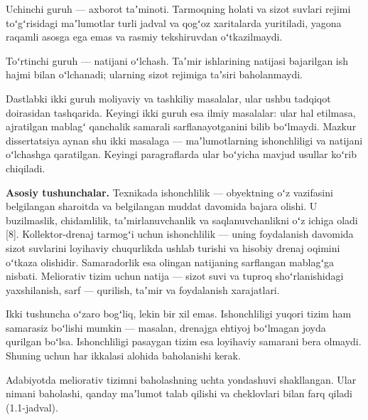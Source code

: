 Uchinchi guruh --- axborot taʼminoti. Tarmoqning holati va sizot suvlari
rejimi toʻgʻrisidagi maʼlumotlar turli jadval va qogʻoz xaritalarda
yuritiladi, yagona raqamli asosga ega emas va rasmiy tekshiruvdan
oʻtkazilmaydi.

Toʻrtinchi guruh --- natijani oʻlchash. Taʼmir ishlarining natijasi
bajarilgan ish hajmi bilan oʻlchanadi; ularning sizot rejimiga taʼsiri
baholanmaydi.

Dastlabki ikki guruh moliyaviy va tashkiliy masalalar, ular ushbu
tadqiqot doirasidan tashqarida. Keyingi ikki guruh esa ilmiy masalalar:
ular hal etilmasa, ajratilgan mablagʻ qanchalik samarali
sarflanayotganini bilib boʻlmaydi. Mazkur dissertatsiya aynan shu ikki
masalaga --- maʼlumotlarning ishonchliligi va natijani oʻlchashga
qaratilgan. Keyingi paragraflarda ular boʻyicha mavjud usullar koʻrib
chiqiladi.


\textbf{Asosiy tushunchalar.} Texnikada ishonchlilik --- obyektning oʻz
vazifasini belgilangan sharoitda va belgilangan muddat davomida bajara
olishi. U buzilmaslik, chidamlilik, taʼmirlanuvchanlik va
saqlanuvchanlikni oʻz ichiga oladi {[}8{]}. Kollektor-drenaj tarmogʻi
uchun ishonchlilik --- uning foydalanish davomida sizot suvlarini
loyihaviy chuqurlikda ushlab turishi va hisobiy drenaj oqimini oʻtkaza
olishidir. Samaradorlik esa olingan natijaning sarflangan mablagʻga
nisbati. Meliorativ tizim uchun natija --- sizot suvi va tuproq
shoʻrlanishidagi yaxshilanish, sarf --- qurilish, taʼmir va foydalanish
xarajatlari.

Ikki tushuncha oʻzaro bogʻliq, lekin bir xil emas. Ishonchliligi yuqori
tizim ham samarasiz boʻlishi mumkin --- masalan, drenajga ehtiyoj
boʻlmagan joyda qurilgan boʻlsa. Ishonchliligi pasaygan tizim esa
loyihaviy samarani bera olmaydi. Shuning uchun har ikkalasi alohida
baholanishi kerak.

Adabiyotda meliorativ tizimni baholashning uchta yondashuvi shakllangan.
Ular nimani baholashi, qanday maʼlumot talab qilishi va cheklovlari
bilan farq qiladi (1.1-jadval).



